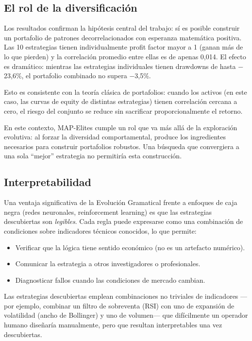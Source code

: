 \documentclass[12pt,a4paper]{article}
\begin{document}
\subsection{El rol de la diversificación}

Los resultados confirman la hipótesis central del trabajo: sí es posible construir
un portafolio de patrones decorrelacionados con esperanza matemática positiva.
Las 10 estrategias tienen individualmente profit factor mayor a 1 (ganan más de
lo que pierden) y la correlación promedio entre ellas es de apenas 0,014. El efecto
es dramático: mientras las estrategias individuales tienen drawdowns de hasta
$-$23,6\%, el portafolio combinado no supera $-$3,5\%.

Esto es consistente con la teoría clásica de portafolios: cuando los activos (en este
caso, las curvas de equity de distintas estrategias) tienen correlación cercana a cero,
el riesgo del conjunto se reduce sin sacrificar proporcionalmente el retorno.

En este contexto, MAP-Elites cumple un rol que va más allá de la exploración
evolutiva: al forzar la diversidad comportamental, produce los ingredientes necesarios
para construir portafolios robustos. Una búsqueda que convergiera a una sola
``mejor'' estrategia no permitiría esta construcción.

\subsection{Interpretabilidad}

Una ventaja significativa de la Evolución Gramatical frente a enfoques de caja negra
(redes neuronales, reinforcement learning) es que las estrategias descubiertas son
\textit{legibles}. Cada regla puede expresarse como una combinación de condiciones
sobre indicadores técnicos conocidos, lo que permite:
\begin{itemize}
\item Verificar que la lógica tiene sentido económico (no es un artefacto numérico).
\item Comunicar la estrategia a otros investigadores o profesionales.
\item Diagnosticar fallos cuando las condiciones de mercado cambian.
\end{itemize}

Las estrategias descubiertas emplean combinaciones no triviales de indicadores ---por
ejemplo, combinar un filtro de sobreventa (RSI) con uno de expansión de volatilidad
(ancho de Bollinger) y uno de volumen--- que difícilmente un operador humano diseñaría
manualmente, pero que resultan interpretables una vez descubiertas.
\end{document}
